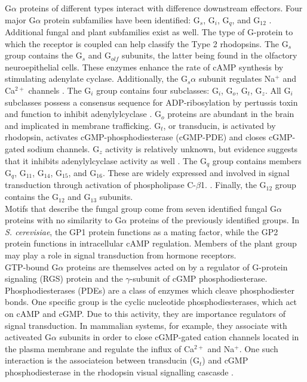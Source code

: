 \indent G$\alpha$ proteins of different types interact with difference downstream effectors. Four major G$\alpha$ protein subfamilies have been identified: G$_{s}$, G$_{i}$, G$_{q}$, and G$_{12}$ \cite{Hepler1992}. Additional fungal \cite{Bolker1998} and plant \cite{Ma1994} subfamilies exist as well. The type of G-protein to which the receptor is coupled can help classify the Type 2 rhodopsins. The G$_{s}$ group contains the G$_{s}$ and G$_{olf}$  subunits, the latter being found in the olfactory neuroepithelial cells. These enzymes enhance the rate of cAMP synthesis by stimulating adenylate cyclase. Additionally, the G$_{s}\alpha$ subunit regulates Na$^{+}$ and Ca$^{2+}$ channels \cite{Hepler1992}. The G$_{i}$ group contains four subclasses: G$_{i}$, G$_{o}$, G$_{t}$, G$_{z}$. All G$_{i}$ subclasses possess a consensus sequence for ADP-ribosylation by pertussis toxin and function to inhibit adenylylcyclase \cite{KABMycotaIII}. G$_{o}$ proteins are abundant in the brain and implicated in membrane trafficking. G$_{t}$, or transducin, is activated by rhodopsin, activates cGMP-phosphodiesterase (cGMP-PDE) and closes cGMP-gated sodium channels. G$_{z}$ activity is relatively unknown, but evidence suggests that it inhibits adenylylcyclase activity as well \cite{KABMycotaIII}. The G$_{q}$ group contains members G$_{q}$, G$_{11}$, G$_{14}$, G$_{15}$, and G$_{16}$. These are widely expressed and involved in signal transduction through activation of phospholipase C-$\beta$1. \cite{KABMycotaIII}. Finally, the G$_{12}$ group contains the G$_{12}$ and G$_{13}$ subunits.\\
\indent Motifs that describe the fungal group come from seven identified fungal G$\alpha$ proteins with no similarity to G$\alpha$ proteins of the previously identified groups. In \textit{S. cerevisiae}, the GP1 protein functions as a mating factor, while the GP2 protein functions in intracellular cAMP regulation. Members of the plant group may play a role in signal transduction from hormone receptors.\\
\indent GTP-bound G$\alpha$ proteins are themselves acted on by a regulator of G-protein signaling (RGS) protein and the $\gamma$-subunit of cGMP phosphodiesterase.\\
\indent Phosphodiesterases (PDEs) are a class of enzymes which cleave phosphodiester bonds. One specific group is the cyclic nucleotide phosphodiesterases, which act on cAMP and cGMP. Due to this activity, they are importance regulators of signal transduction. In mammalian systems, for example, they associate with activeated G$\alpha$ subunits in order to close cGMP-gated cation channels located in the plasma membrane and regulate the influx of Ca$^{2+}$ and Na$^{+}$. One such interaction is the associateion between transducin (G$_{t}$) and cGMP phosphodiesterase in the rhodopsin visual signalling cascasde \cite{}.\\
